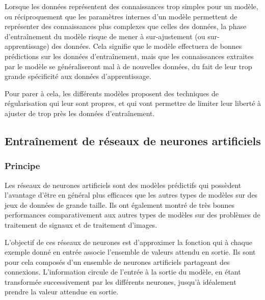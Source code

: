 \par Lorsque les données représentent des connaissances trop simples pour un modèle, ou réciproquement que les paramètres internes d'un modèle permettent de représenter des connaissances plus complexes que celles des données, la phase d'entraînement du modèle risque de mener à sur-ajustement (ou sur-apprentissage) des données. Cela signifie que le modèle effectuera de bonnes prédictions sur les données d'entraînement, mais que les connaissances extraites par le modèle se généraliseront mal à de nouvelles données, du fait de leur trop grande spécificité aux données d'apprentissage.\\
\par Pour parer à cela, les différents modèles proposent des techniques de régularisation qui leur sont propres, et qui vont permettre de limiter leur liberté à ajuster de trop près les données d'entraînement.


\subsection{Entraînement de réseaux de neurones artificiels}

\label{apprentissage_automatique_nn}

\subsubsection{Principe}
\par Les réseaux de neurones artificiels sont des modèles prédictifs qui possèdent l'avantage d'être en général plus efficaces que les autres types de modèles sur des jeux de données de grande taille. Ils ont également montré de très bonnes performances comparativement aux autres types de modèles sur des problèmes de traitement de signaux et de traitement d'images.\\

\par L'objectif de ces réseaux de neurones est d'approximer la fonction qui à chaque exemple donné en entrée associe l'ensemble de valeurs attendu en sortie. Ils sont pour cela composés d'un ensemble de neurones artificiels partageant des connexions. L'information circule de l'entrée à la sortie du modèle, en étant transformée successivement par les différents neurones, jusqu'à idéalement prendre la valeur attendue en sortie.\\

